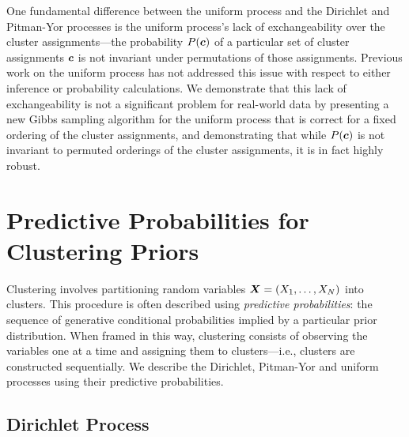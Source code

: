 \documentclass{article}
\begin{document}
One fundamental difference between the uniform process and the
Dirichlet and Pitman-Yor processes is the uniform process's lack of
exchangeability over the cluster assignments---the probability
$P(\boldsymbol{c})$ of a particular set of cluster assignments $\boldsymbol{c}$ is not
invariant under permutations of those assignments. Previous work on
the uniform process has not addressed this issue with respect to
either inference or probability calculations. We demonstrate that this
lack of exchangeability is not a significant problem for real-world
data by presenting a new Gibbs sampling algorithm for the uniform
process that is correct for a fixed ordering of the cluster
assignments, and demonstrating that while $P(\boldsymbol{c})$ is not invariant to
permuted orderings of the cluster assignments, it is in fact highly
robust.

\section{Predictive Probabilities for Clustering Priors}
\label{priors}

Clustering involves partitioning random variables $\boldsymbol{X} = (X_1, \ldots,
X_N)$ into clusters. This procedure is often described using
\emph{predictive probabilities}: the sequence of generative
conditional probabilities implied by a particular prior
distribution. When framed in this way, clustering consists of
observing the variables one at a time and assigning them to
clusters---i.e., clusters are constructed sequentially. We describe
the Dirichlet, Pitman-Yor and uniform processes using their predictive
probabilities.

\subsection{Dirichlet Process}
\end{document}

